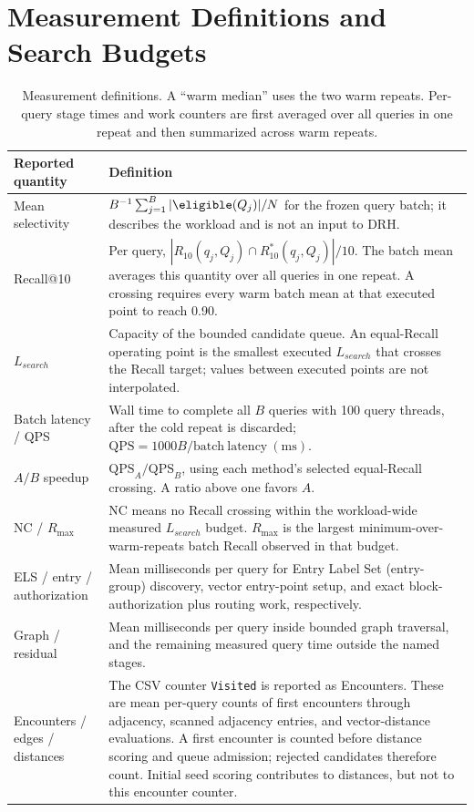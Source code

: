 \section{Measurement Definitions and Search Budgets}
\label{sec:measurement-details}
\begin{table}[H]
\caption{Measurement definitions.  A ``warm median'' uses the two warm repeats.  Per-query stage times and work counters are first averaged over all
queries in one repeat and then summarized across warm repeats.}
\label{tab:metric-definitions}
\centering
\small
\begin{tabular}{p{}p{}}
\toprule
Reported quantity & Definition \\
\midrule
Mean selectivity & $B^{-1}\sum_{j=1}^{B}|\eligible(Q_j)|/N$ for the frozen query batch; it describes the workload and is not an input to DRH. \\
Recall@10 & Per query, $|R_{10}(q_j,Q_j)\cap R^*_{10}(q_j,Q_j)|/10$. The batch mean averages this quantity over all queries in one repeat. A crossing requires every warm batch mean at that executed point to reach 0.90. \\
$L_{search}$ & Capacity of the bounded candidate queue.  An equal-Recall operating point is the smallest executed $L_{search}$ that crosses the Recall target; values between executed points are not interpolated. \\
Batch latency / QPS & Wall time to complete all $B$ queries with 100 query threads, after the cold repeat is discarded; $\mathrm{QPS}=1000B/\mathrm{batch\ latency\ (ms)}$. \\
$A/B$ speedup & $\mathrm{QPS}_A/\mathrm{QPS}_B$, using each method's selected equal-Recall crossing.  A ratio above one favors $A$. \\
NC / $R_{\max}$ & NC means no Recall crossing within the workload-wide measured $L_{search}$ budget.  $R_{\max}$ is the largest minimum-over-warm-repeats batch Recall observed in that budget. \\
ELS / entry / authorization & Mean milliseconds per query for Entry Label Set (entry-group) discovery, vector entry-point setup, and exact block-authorization plus routing work, respectively. \\
Graph / residual & Mean milliseconds per query inside bounded graph traversal, and the remaining measured query time outside the named stages. \\
Encounters / edges / distances & The CSV counter \texttt{Visited} is reported as Encounters. These are mean per-query counts of first encounters through adjacency, scanned adjacency entries, and vector-distance evaluations. A first encounter is counted before distance scoring and queue admission; rejected candidates therefore count. Initial seed scoring contributes to distances, but not to this encounter counter. \\
\bottomrule
\end{tabular}
\end{table}
\authoritativeSharedSearchBudgetTable
\authoritativeScreenAppendix

